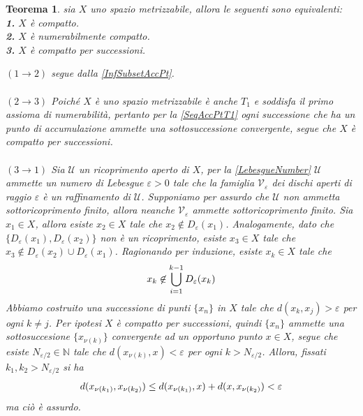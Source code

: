 \documentclass[oneside, 11pt]{amsbook}
\makeatletter
\newcommand{\0}{{(0)}}
\newcommand{\3}{{(3)}}
\theoremstyle{colonplain}
\newtheorem{thm}{Teorema}[chapter]
\theoremstyle{colondefinition}
\theoremstyle{colonremark}
\numberwithin{equation}{chapter}
\renewcommand{\proofname}{Dimostrazione}
\renewenvironment{proof}[1][\proofname]{\par
  \pushQED{\qed}%
  \normalfont \topsep6\p@\@plus6\p@\relax
  \trivlist
  \item[\hskip\labelsep\bfseries #1:]\ignorespaces
}{%
  \popQED\endtrivlist\@endpefalse
}
\makeatother
\begin{document}
\begin{thm}\label{CompactSeqCompactMetric}
sia $X$ uno spazio metrizzabile, allora le seguenti sono equivalenti: \\
\textbf{1.} $X$ è compatto. \\
\textbf{2.} $X$ è numerabilmente compatto. \\
\textbf{3.} $X$ è compatto per successioni.
\begin{proof}
$(1 \rightarrow 2)$ segue dalla \cref{InfSubsetAccPt}. \\ \\
$(2 \rightarrow 3)$ Poiché $X$ è uno spazio metrizzabile è anche $T_1$ e soddisfa il primo assioma di numerabilità, pertanto per la \cref{SeqAccPtT1} ogni successione che ha un punto di accumulazione ammette una sottosuccessione convergente, segue che $X$ è compatto per successioni. \\ \\
$(3 \rightarrow 1)$ Sia $\mathcal{U}$ un ricoprimento aperto di $X$, per la \cref{LebesgueNumber} $\mathcal{U}$ ammette un numero di Lebesgue $\varepsilon > 0$ tale che la famiglia $\mathcal{V}_\varepsilon$ dei dischi aperti di raggio $\varepsilon$ è un raffinamento di $\mathcal{U}$. Supponiamo per assurdo che $\mathcal{U}$ non ammetta sottoricoprimento finito, allora neanche $\mathcal{V}_\varepsilon$ ammette sottoricoprimento finito. Sia $x_1 \in X$, allora esiste $x_2 \in X$ tale che $x_2 \not\in D_\varepsilon(x_1)$. Analogamente, dato che $\{D_\varepsilon(x_1), D_\varepsilon(x_2)\}$ non è un ricoprimento, esiste $x_3 \in X$ tale che $x_3 \not\in D_\varepsilon(x_2) \cup D_\varepsilon(x_1)$. Ragionando per induzione, esiste $x_k \in X$ tale che
\begin{align}
    x_k \not\in \bigcup_{i = 1}^{k - 1}D_\varepsilon(x_k) \notag
\end{align}
Abbiamo costruito una successione di punti $\{x_n\}$ in $X$ tale che $d(x_k, x_j) > \varepsilon$ per ogni $k \neq j$. Per ipotesi $X$ è compatto per successioni, quindi $\{x_n\}$ ammette una sottosuccesione $\{x_{\nu(k)}\}$ convergente ad un opportuno punto $x \in X$, segue che esiste $N_{\varepsilon/2} \in \mathbb{N}$ tale che $d(x_{\nu(k)}, x) < \varepsilon$ per ogni $k > N_{\varepsilon/2}$. Allora, fissati $k_1, k_2 > N_{\varepsilon/2}$ si ha 
\begin{align}
    d(x_{\nu(k_1)}, x_{\nu(k_2)}) \leq d(x_{\nu(k_1)}, x) + d(x, x_{\nu(k_2)}) < \varepsilon \notag
\end{align}
ma ciò è assurdo.
\end{proof}
\end{thm}
\end{document}
